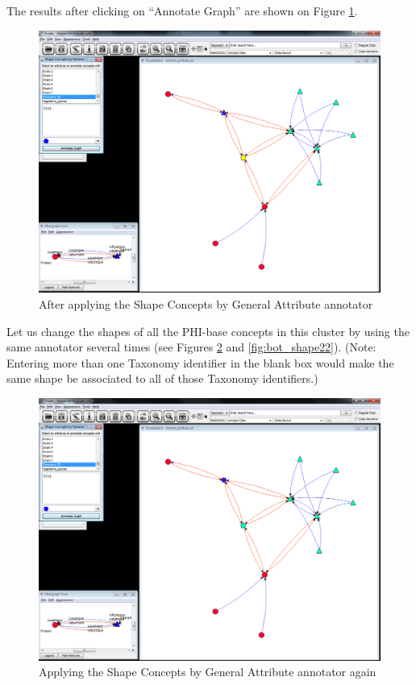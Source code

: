 The results after clicking on ``Annotate Graph'' are shown on Figure \ref{fig:bot_shape_after}.

\begin{figure}[H]
\centering
\includegraphics[scale=0.35]{images/Oct12/app2fig9.png} 
\caption{After applying the Shape Concepts by General Attribute annotator}
\label{fig:bot_shape_after}
\end{figure}

Let us change the shapes of all the PHI-base concepts in this cluster by using the same annotator several times (see Figures \ref{fig:bot_shape21} and \ref{fig:bot_shape22}). 
(Note: Entering more than one Taxonomy identifier in the blank box would make the same shape be associated to all of those Taxonomy identifiers.)

\begin{figure}[H]
\centering
\includegraphics[scale=0.35]{images/Oct12/app2fig10.png} 
\caption{Applying the Shape Concepts by General Attribute annotator again}
\label{fig:bot_shape21}
\end{figure}

